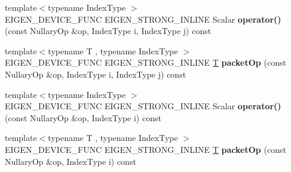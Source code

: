 \begin{DoxyCompactItemize}
\item 
\mbox{\label{struct_eigen_1_1internal_1_1nullary__wrapper_3_01_scalar_00_01_nullary_op_00_01false_00_01true_00_01false_01_4_a890b377218120aa98a869849ea42e216}} 
{\footnotesize template$<$typename Index\+Type $>$ }\\E\+I\+G\+E\+N\+\_\+\+D\+E\+V\+I\+C\+E\+\_\+\+F\+U\+NC E\+I\+G\+E\+N\+\_\+\+S\+T\+R\+O\+N\+G\+\_\+\+I\+N\+L\+I\+NE Scalar {\bfseries operator()} (const Nullary\+Op \&op, Index\+Type i, Index\+Type j) const
\item 
\mbox{\label{struct_eigen_1_1internal_1_1nullary__wrapper_3_01_scalar_00_01_nullary_op_00_01false_00_01true_00_01false_01_4_a7a489ac076fd07813a207e486f96cd3b}} 
{\footnotesize template$<$typename T , typename Index\+Type $>$ }\\E\+I\+G\+E\+N\+\_\+\+D\+E\+V\+I\+C\+E\+\_\+\+F\+U\+NC E\+I\+G\+E\+N\+\_\+\+S\+T\+R\+O\+N\+G\+\_\+\+I\+N\+L\+I\+NE \hyperlink{group___sparse_core___module}{T} {\bfseries packet\+Op} (const Nullary\+Op \&op, Index\+Type i, Index\+Type j) const
\item 
\mbox{\label{struct_eigen_1_1internal_1_1nullary__wrapper_3_01_scalar_00_01_nullary_op_00_01false_00_01true_00_01false_01_4_a31aa5cfef4f7d0fd7828da74f8960c6e}} 
{\footnotesize template$<$typename Index\+Type $>$ }\\E\+I\+G\+E\+N\+\_\+\+D\+E\+V\+I\+C\+E\+\_\+\+F\+U\+NC E\+I\+G\+E\+N\+\_\+\+S\+T\+R\+O\+N\+G\+\_\+\+I\+N\+L\+I\+NE Scalar {\bfseries operator()} (const Nullary\+Op \&op, Index\+Type i) const
\item 
\mbox{\label{struct_eigen_1_1internal_1_1nullary__wrapper_3_01_scalar_00_01_nullary_op_00_01false_00_01true_00_01false_01_4_aedb76f03614fc386b2a8c8121476cdc6}} 
{\footnotesize template$<$typename T , typename Index\+Type $>$ }\\E\+I\+G\+E\+N\+\_\+\+D\+E\+V\+I\+C\+E\+\_\+\+F\+U\+NC E\+I\+G\+E\+N\+\_\+\+S\+T\+R\+O\+N\+G\+\_\+\+I\+N\+L\+I\+NE \hyperlink{group___sparse_core___module}{T} {\bfseries packet\+Op} (const Nullary\+Op \&op, Index\+Type i) const

\end{DoxyCompactItemize}
